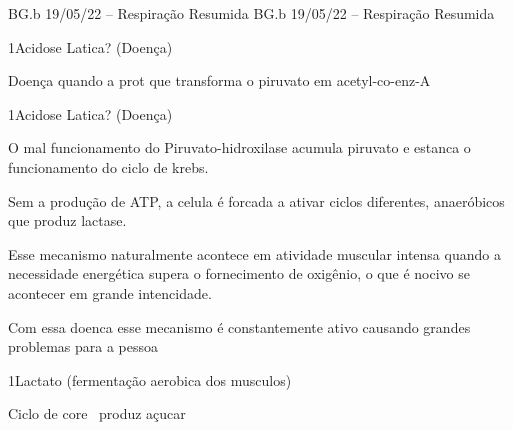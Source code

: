 \documentclass[\mainfilename]{subfiles}
\begin{document}
{BG.b 19/05/22 -- Respiração Resumida}
{BG.b 19/05/22 -- Respiração Resumida}

\begin{sectionBox}1{Acidose Latica? (Doença)}
    
    Doença quando a prot que transforma o piruvato em acetyl-co-enz-A
    
\end{sectionBox}

\begin{questionBox}1{Acidose Latica? (Doença)}
    
    O mal funcionamento do Piruvato-hidroxilase acumula piruvato e estanca o funcionamento do ciclo de krebs.

    Sem a produção de ATP, a celula é forcada a ativar ciclos diferentes, anaeróbicos que produz lactase.
    
    Esse mecanismo naturalmente acontece em atividade muscular intensa quando a necessidade energética supera o fornecimento de oxigênio, o que é nocivo se acontecer em grande intencidade.

    Com essa doenca esse mecanismo é constantemente ativo causando grandes problemas para a pessoa
    
\end{questionBox}

\begin{sectionBox}1{Lactato (fermentação aerobica dos musculos)}
    
    Ciclo de core \to\ produz açucar
    
\end{sectionBox}
\end{document}

